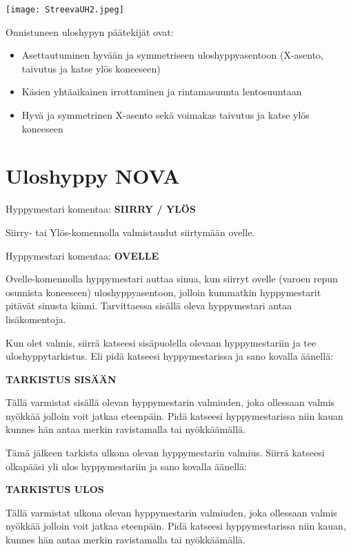 \begin{Figure}\centering\texttt{[image: StreevaUH2.jpeg]}\end{Figure} 


Onnistuneen uloshypyn päätekijät ovat: 

\begin{itemize}
\item  Asettautuminen hyvään ja symmetriseen uloshyppyasentoon (X-asento, taivutus ja katse ylös koneeseen) 
\item  Käsien yhtäaikainen irrottaminen ja rintamasuunta lentosuuntaan  
\item  Hyvä ja symmetrinen X-asento sekä voimakas taivutus ja katse ylös koneeseen 
\end{itemize}
\section{ Uloshyppy NOVA }
\label{hyppytapahtuma-uloshyppy-nova}


Hyppymestari komentaa: \textbf{SIIRRY / YLÖS} 


Siirry- tai Ylös-komennolla valmistaudut siirtymään ovelle.  


Hyppymestari komentaa: \textbf{OVELLE} 


Ovelle-komennolla hyppymestari auttaa sinua, kun siirryt ovelle (varoen repun osumista koneeseen) uloshyppyasentoon, jolloin kummatkin hyppymestarit pitävät sinusta kiinni. Tarvittaessa sisällä oleva hyppymestari antaa lisäkomentoja. 


Kun olet valmis, siirrä katseesi sisäpuolella olevaan hyppymestariin ja tee uloshyppytarkistus. Eli pidä katseesi hyppymestarissa ja sano kovalla äänellä: 


\textbf{TARKISTUS SISÄÄN} 


Tällä varmistat sisällä olevan hyppymestarin valmiuden, joka ollessaan valmis nyökkää jolloin voit jatkaa eteenpäin. Pidä katseesi hyppymestarissa niin kauan kunnes hän antaa merkin ravistamalla tai nyökkäämällä. 


Tämä jälkeen tarkista ulkona olevan hyppymestarin valmius. Siirrä katseesi olkapääsi yli ulos hyppymestariin ja sano kovalla äänellä: 


\textbf{TARKISTUS ULOS} 


Tällä varmistat ulkona olevan hyppymestarin valmiuden, joka ollessaan valmis nyökkää jolloin voit jatkaa eteenpäin. Pidä katseesi hyppymestarissa niin kauan, kunnes hän antaa merkin ravistamalla tai nyökkäämällä. 


